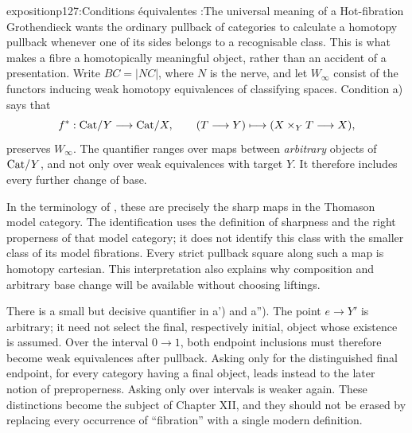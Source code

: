 \begin{dcomment}{exposition}{p127:Conditions équivalentes :}{The universal meaning of a Hot-fibration}
Grothendieck wants the ordinary pullback of categories to calculate a homotopy pullback whenever one of its sides belongs to a recognisable class. This is what makes a fibre a homotopically meaningful object, rather than an accident of a presentation. Write \(BC=|NC|\), where \(N\) is the nerve, and let \(W_\infty\) consist of the functors inducing weak homotopy equivalences of classifying spaces. Condition a) says that
\[
 f^*:\mathrm{Cat}/Y\longrightarrow\mathrm{Cat}/X,\qquad
 (T\longrightarrow Y)\longmapsto(X\times_Y T\longrightarrow X),
\]
preserves \(W_\infty\). The quantifier ranges over maps between \emph{arbitrary} objects of \(\mathrm{Cat}/Y\), and not only over weak equivalences with target \(Y\). It therefore includes every further change of base.

In the terminology of \citet[\S2, Proposition 2.7]{Rezk1998Sharp}, these are precisely the sharp maps in the Thomason model category. The identification uses the definition of sharpness and the right properness of that model category; it does not identify this class with the smaller class of its model fibrations. Every strict pullback square along such a map is homotopy cartesian. This interpretation also explains why composition and arbitrary base change will be available without choosing liftings.

There is a small but decisive quantifier in a') and a''). The point \(e\longrightarrow Y'\) is arbitrary; it need not select the final, respectively initial, object whose existence is assumed. Over the interval \(0\longrightarrow1\), both endpoint inclusions must therefore become weak equivalences after pullback. Asking only for the distinguished final endpoint, for every category having a final object, leads instead to the later notion of preproperness. Asking only over intervals is weaker again. These distinctions become the subject of Chapter XII, and they should not be erased by replacing every occurrence of “fibration” with a single modern definition.
\end{dcomment}


